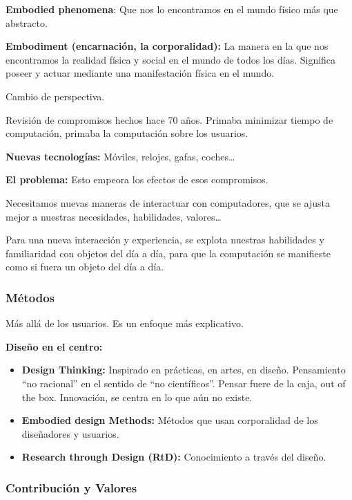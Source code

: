\documentclass[12pt, twoside, openright]{report} %
\begin{document}
\textbf{Embodied phenomena}: Que nos lo encontramos en el mundo físico
más que abstracto.

\textbf{Embodiment (encarnación, la corporalidad):} La manera en la que
nos encontramos la realidad física y social en el mundo de todos los
días. Significa poseer y actuar mediante una manifestación física en el
mundo.

Cambio de perspectiva.

Revisión de compromisos hechos hace 70 años. Primaba minimizar tiempo de
computación, primaba la computación sobre los usuarios.

\textbf{Nuevas tecnologías:} Móviles, relojes, gafas, coches\ldots{}

\textbf{El problema:} Esto empeora los efectos de esos compromisos.

Necesitamos nuevas maneras de interactuar con computadores, que se
ajusta mejor a nuestras necesidades, habilidades, valores\ldots{}

Para una nueva interacción y experiencia, se explota nuestras habilidades
y familiaridad con objetos del día a día, para que la computación se
manifieste como si fuera un objeto del día a día.

\subsubsection{Métodos}

Más allá de los usuarios. Es un enfoque más explicativo.

\textbf{Diseño en el centro:}

\begin{itemize}
	\item \textbf{Design Thinking:} Inspirado en prácticas, en artes, en diseño.
	      Pensamiento ``no racional'' en el sentido de ``no científicos''.
	      Pensar fuere de la caja, out of the box. Innovación, se centra en lo
	      que aún no existe.
	\item \textbf{Embodied design Methods:} Métodos que usan corporalidad de los
	      diseñadores y usuarios.
	\item \textbf{Research through Design (RtD):} Conocimiento a través del
	      diseño.
\end{itemize}

\subsubsection{Contribución y Valores}
\end{document}
